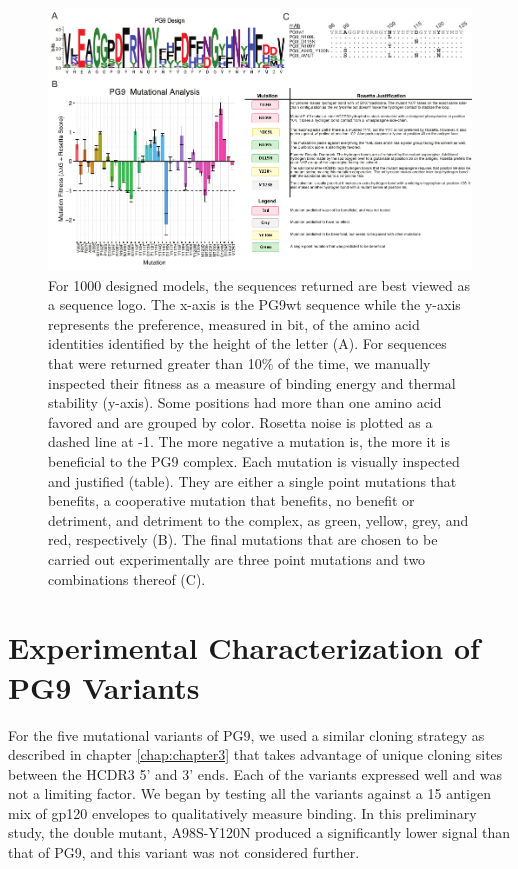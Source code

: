 \begin{figure}[!t]
   \centering
   \includegraphics[scale=1.5,width=.99\textwidth]{images/chapter4/figure4_3.pdf} %
   \caption[Redesign of PG9 HCDR3]{For 1000 designed models, the sequences returned are best viewed as a sequence logo. The x-axis is the PG9wt sequence while the y-axis represents the preference, measured in bit, of the amino acid identities identified by the height of the letter (A). For sequences that were returned greater than 10\% of the time, we manually inspected their fitness as a measure of binding energy and thermal stability (y-axis). Some positions had more than one amino acid favored and are grouped by color. Rosetta noise is plotted as a dashed line at -1. The more negative a mutation is, the more it is beneficial to the PG9 complex. Each mutation is visually inspected and justified (table). They are either a single point mutations that benefits, a cooperative mutation that benefits, no benefit or detriment, and detriment to the complex, as green, yellow, grey, and red, respectively (B). The final mutations that are chosen to be carried out experimentally are three point mutations and two combinations thereof (C).}
   \label{fig:figure4_3}
\end{figure}


\section{Experimental Characterization of PG9 Variants}
For the five mutational variants of PG9, we used a similar cloning strategy as described in chapter \ref{chap:chapter3} that takes advantage of unique cloning sites between the HCDR3 5' and 3' ends. Each of the variants expressed well and was not a limiting factor. We began by testing all the variants against a 15 antigen mix of gp120 envelopes to qualitatively measure binding. In this preliminary study, the double mutant, A98S-Y120N produced a significantly lower signal than that of PG9, and this variant was not considered further.

